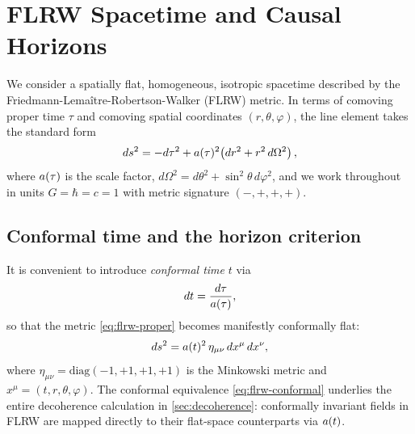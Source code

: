 
\section{FLRW Spacetime and Causal Horizons}
\label{sec:flrw}

We consider a spatially flat, homogeneous, isotropic spacetime described by
the Friedmann-Lema\^{i}tre-Robertson-Walker (FLRW) metric.  In terms of
comoving proper time $\tau$ and comoving spatial coordinates
$(r,\theta,\varphi)$, the line element takes the standard form
%
\begin{equation}
  ds^{2} = -d\tau^{2} + a(\tau)^{2}
           \!\left(dr^{2} + r^{2}\,d\Omega^{2}\right) ,
  \label{eq:flrw-proper}
\end{equation}
%
where $a(\tau)$ is the scale factor, $d\Omega^{2} =
d\theta^{2}+\sin^{2}\!\theta\,d\varphi^{2}$, and we work throughout in
units $G = \hbar = c = 1$ with metric signature $(-,+,+,+)$.

\subsection{Conformal time and the horizon criterion}
\label{sec:flrw-conformal}

It is convenient to introduce \emph{conformal time} $t$ via
%
\begin{equation}
  dt = \frac{d\tau}{a(\tau)} ,
  \label{eq:conformal-time-def}
\end{equation}
%
so that the metric \cref{eq:flrw-proper} becomes manifestly conformally flat:
%
\begin{equation}
  ds^{2} = a(t)^{2}\,\eta_{\mu\nu}\,dx^{\mu}\,dx^{\nu} ,
  \label{eq:flrw-conformal}
\end{equation}
%
where $\eta_{\mu\nu} = \mathrm{diag}(-1,+1,+1,+1)$ is the Minkowski metric
and $x^{\mu} = (t,r,\theta,\varphi)$.  The conformal equivalence
\cref{eq:flrw-conformal} underlies the entire decoherence calculation in
\cref{sec:decoherence}: conformally invariant fields in FLRW are mapped
directly to their flat-space counterparts via $a(t)$.

